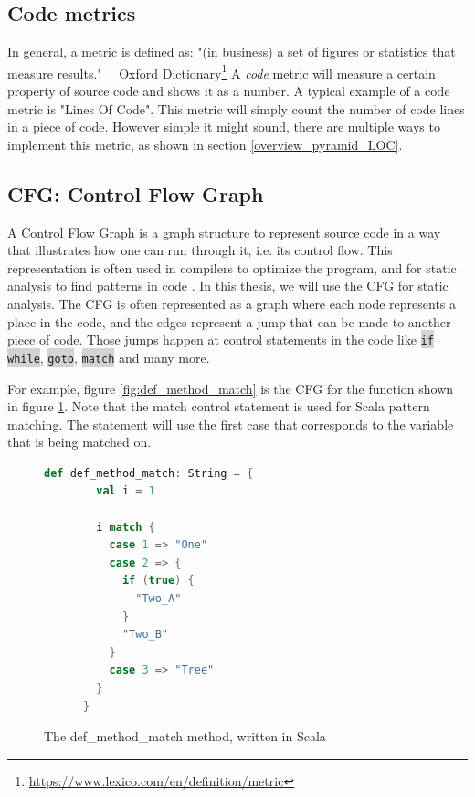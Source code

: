 \documentclass[onecolumn]{article}
\newcommand{\code}[1]{\colorbox{lightgray}{\texttt{#1}}}
\begin{document}
\subsection{Code metrics}
In general, a metric is defined as: "(in business) a set of figures or statistics that measure results." ~~Oxford Dictionary\footnote{\url{https://www.lexico.com/en/definition/metric}}
A \textit{code} metric will measure a certain property of source code and shows it as a number. A typical example of a code metric is "Lines Of Code". This metric will simply count the number of code lines in a piece of code. However simple it might sound, there are multiple ways to implement this metric, as shown in section \ref{overview_pyramid_LOC}.


\subsection{CFG: Control Flow Graph}
A Control Flow Graph is a graph structure to represent source code in a way that illustrates how one can run through it, i.e. its control flow. This representation is often used in compilers to optimize the program, and for static analysis to find patterns in code \cite{mccabe1976complexity}. In this thesis, we will use the CFG for static analysis. The CFG is often represented as a graph where each node represents a place in the code, and the edges represent a jump that can be made to another piece of code. Those jumps happen at control statements in the code like \code{if} \code{while}, \code{goto}, \code{match} and many more. 

For example, figure \ref{fig:def_method_match} is the CFG for the function shown in figure \ref{fig:def_method_match_code}. Note that the match control statement is used for Scala pattern matching. The statement will use the first case that corresponds to the variable that is being matched on.

\begin{figure}[H]
    \centering
    \begin{lstlisting}[language=scala]
      def def_method_match: String = {
        val i = 1
    
        i match {
          case 1 => "One"
          case 2 => {
            if (true) {
              "Two_A"
            }
            "Two_B"
          }
          case 3 => "Tree"
        }
      }
    \end{lstlisting}
    \caption{The def\_method\_match method, written in Scala}
    \label{fig:def_method_match_code}
\end{figure}
\end{document}
